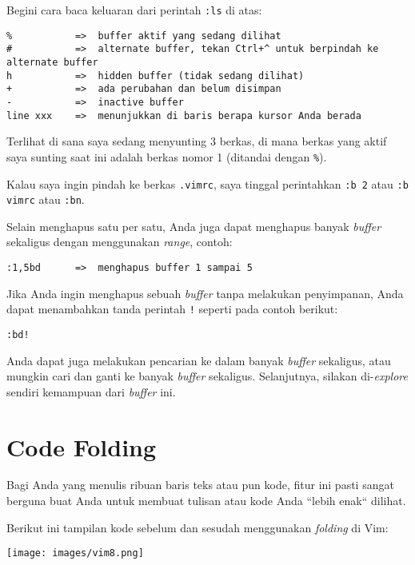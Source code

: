 \documentclass{article}
\begin{document}
Begini cara baca keluaran dari perintah \verb=:ls= di atas:

\begin{verbatim}
%           =>  buffer aktif yang sedang dilihat
#           =>  alternate buffer, tekan Ctrl+^ untuk berpindah ke alternate buffer
h           =>  hidden buffer (tidak sedang dilihat)
+           =>  ada perubahan dan belum disimpan
-           =>  inactive buffer
line xxx    =>  menunjukkan di baris berapa kursor Anda berada
\end{verbatim}

Terlihat di sana saya sedang menyunting 3 berkas, di mana
berkas yang aktif saya sunting saat ini adalah berkas nomor
1 (ditandai dengan \verb=%=).

Kalau saya ingin pindah ke berkas \verb=.vimrc=, saya
tinggal perintahkan \verb=:b 2= atau \verb=:b vimrc= atau
\verb=:bn=.

Selain menghapus satu per satu, Anda juga dapat menghapus
banyak \emph{buffer} sekaligus dengan menggunakan
\emph{range}, contoh:

\begin{verbatim}
:1,5bd      =>  menghapus buffer 1 sampai 5
\end{verbatim}

Jika Anda ingin menghapus sebuah \emph{buffer} tanpa
melakukan penyimpanan, Anda dapat menambahkan tanda perintah
\verb=!= seperti pada contoh berikut:

\begin{verbatim}
:bd!
\end{verbatim}

Anda dapat juga melakukan pencarian ke dalam banyak
\emph{buffer} sekaligus, atau mungkin cari dan ganti ke
banyak \emph{buffer} sekaligus. Selanjutnya, silakan
di-\emph{explore} sendiri kemampuan dari \emph{buffer} ini.

\section{Code Folding}
Bagi Anda yang menulis ribuan baris teks atau pun kode,
fitur ini pasti sangat berguna buat Anda untuk membuat
tulisan atau kode Anda ``lebih enak`` dilihat.

Berikut ini tampilan kode sebelum dan sesudah menggunakan
\emph{folding} di Vim:

\vspace{12pt}

\texttt{[image: images/vim8.png]}
\end{document}
